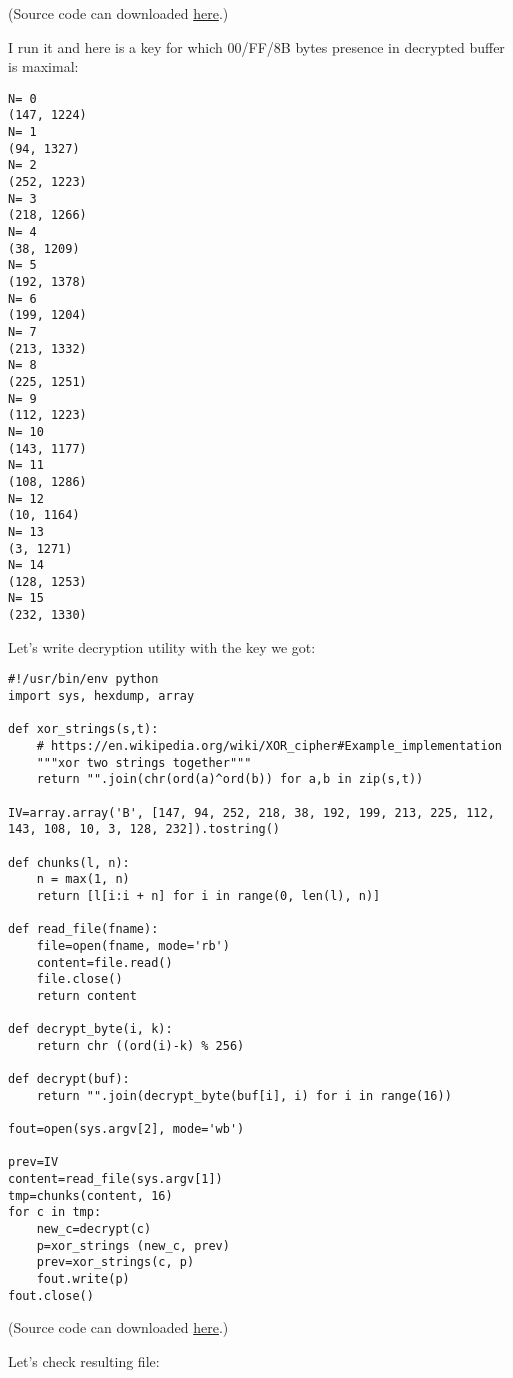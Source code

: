 (Source code can downloaded \href{https://github.com/dennis714/yurichev.com/blob/master/blog/breaking_simple_exec_crypto/files/decrypt.py}{here}.)

I run it and here is a key for which 00/FF/8B bytes presence in decrypted buffer is maximal:

\begin{lstlisting}
N= 0
(147, 1224)
N= 1
(94, 1327)
N= 2
(252, 1223)
N= 3
(218, 1266)
N= 4
(38, 1209)
N= 5
(192, 1378)
N= 6
(199, 1204)
N= 7
(213, 1332)
N= 8
(225, 1251)
N= 9
(112, 1223)
N= 10
(143, 1177)
N= 11
(108, 1286)
N= 12
(10, 1164)
N= 13
(3, 1271)
N= 14
(128, 1253)
N= 15
(232, 1330)
\end{lstlisting}

Let's write decryption utility with the key we got:

\begin{lstlisting}
#!/usr/bin/env python
import sys, hexdump, array

def xor_strings(s,t):
    # https://en.wikipedia.org/wiki/XOR_cipher#Example_implementation
    """xor two strings together"""
    return "".join(chr(ord(a)^ord(b)) for a,b in zip(s,t))

IV=array.array('B', [147, 94, 252, 218, 38, 192, 199, 213, 225, 112, 143, 108, 10, 3, 128, 232]).tostring()

def chunks(l, n):
    n = max(1, n)
    return [l[i:i + n] for i in range(0, len(l), n)]

def read_file(fname):
    file=open(fname, mode='rb')
    content=file.read()
    file.close()
    return content

def decrypt_byte(i, k):
    return chr ((ord(i)-k) % 256)

def decrypt(buf):
    return "".join(decrypt_byte(buf[i], i) for i in range(16))

fout=open(sys.argv[2], mode='wb')

prev=IV
content=read_file(sys.argv[1])
tmp=chunks(content, 16)
for c in tmp:
    new_c=decrypt(c)
    p=xor_strings (new_c, prev)
    prev=xor_strings(c, p)
    fout.write(p)
fout.close()
\end{lstlisting}

(Source code can downloaded \href{https://github.com/dennis714/yurichev.com/blob/master/blog/breaking_simple_exec_crypto/files/decrypt2.py}{here}.)

Let's check resulting file:




